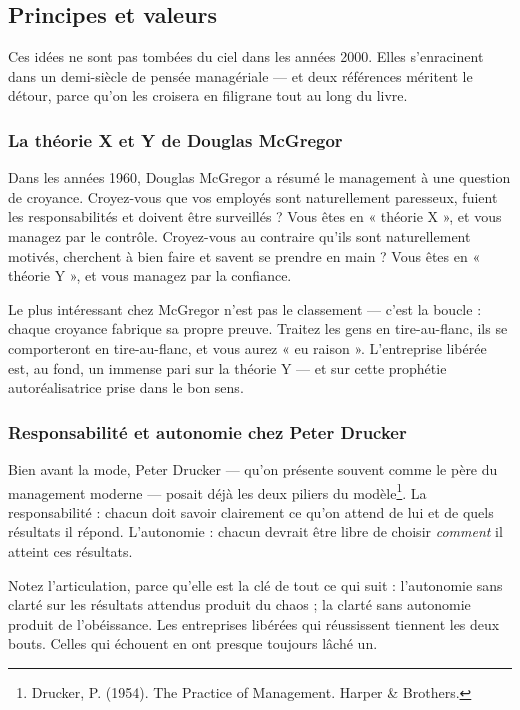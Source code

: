 \subsection*{Principes et valeurs}

Ces idées ne sont pas tombées du ciel dans les années 2000. Elles s'enracinent dans un demi-siècle de pensée managériale — et deux références méritent le détour, parce qu'on les croisera en filigrane tout au long du livre.

\subsubsection*{La théorie X et Y de Douglas McGregor}
Dans les années 1960, Douglas McGregor a résumé le management à une question de croyance. Croyez-vous que vos employés sont naturellement paresseux, fuient les responsabilités et doivent être surveillés ? Vous êtes en « théorie X », et vous managez par le contrôle. Croyez-vous au contraire qu'ils sont naturellement motivés, cherchent à bien faire et savent se prendre en main ? Vous êtes en « théorie Y », et vous managez par la confiance.

Le plus intéressant chez McGregor n'est pas le classement — c'est la boucle : chaque croyance fabrique sa propre preuve. Traitez les gens en tire-au-flanc, ils se comporteront en tire-au-flanc, et vous aurez « eu raison ». L'entreprise libérée est, au fond, un immense pari sur la théorie Y — et sur cette prophétie autoréalisatrice prise dans le bon sens.

\subsubsection*{Responsabilité et autonomie chez Peter Drucker}

Bien avant la mode, Peter Drucker — qu'on présente souvent comme le père du management moderne — posait déjà les deux piliers du modèle\footnote{Drucker, P. (1954). The Practice of Management. Harper \& Brothers.}. La responsabilité : chacun doit savoir clairement ce qu'on attend de lui et de quels résultats il répond. L'autonomie : chacun devrait être libre de choisir \emph{comment} il atteint ces résultats.

Notez l'articulation, parce qu'elle est la clé de tout ce qui suit : l'autonomie sans clarté sur les résultats attendus produit du chaos ; la clarté sans autonomie produit de l'obéissance. Les entreprises libérées qui réussissent tiennent les deux bouts. Celles qui échouent en ont presque toujours lâché un.

